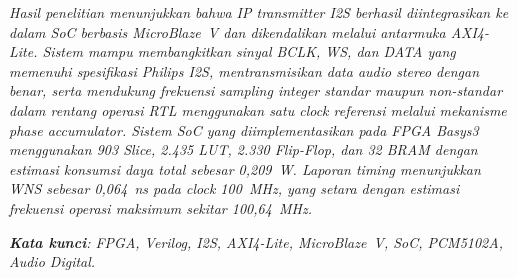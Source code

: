 \hspace{1cm}\textit{Hasil penelitian menunjukkan bahwa IP transmitter I2S berhasil diintegrasikan ke dalam SoC berbasis MicroBlaze~V dan dikendalikan melalui antarmuka AXI4-Lite. Sistem mampu membangkitkan sinyal BCLK, WS, dan DATA yang memenuhi spesifikasi Philips I2S, mentransmisikan data audio stereo dengan benar, serta mendukung frekuensi sampling integer standar maupun non-standar dalam rentang operasi RTL menggunakan satu clock referensi melalui mekanisme phase accumulator. Sistem SoC yang diimplementasikan pada FPGA Basys3 menggunakan 903 Slice, 2.435 LUT, 2.330 Flip-Flop, dan 32 BRAM dengan estimasi konsumsi daya total sebesar 0,209~W. Laporan timing menunjukkan WNS sebesar 0,064~ns pada clock 100~MHz, yang setara dengan estimasi frekuensi operasi maksimum sekitar 100,64~MHz.}
\par\vspace{0.8em}

\noindent\textit{\textbf{Kata kunci}: FPGA, Verilog, I2S, AXI4-Lite, MicroBlaze~V, SoC, PCM5102A, Audio Digital.}
